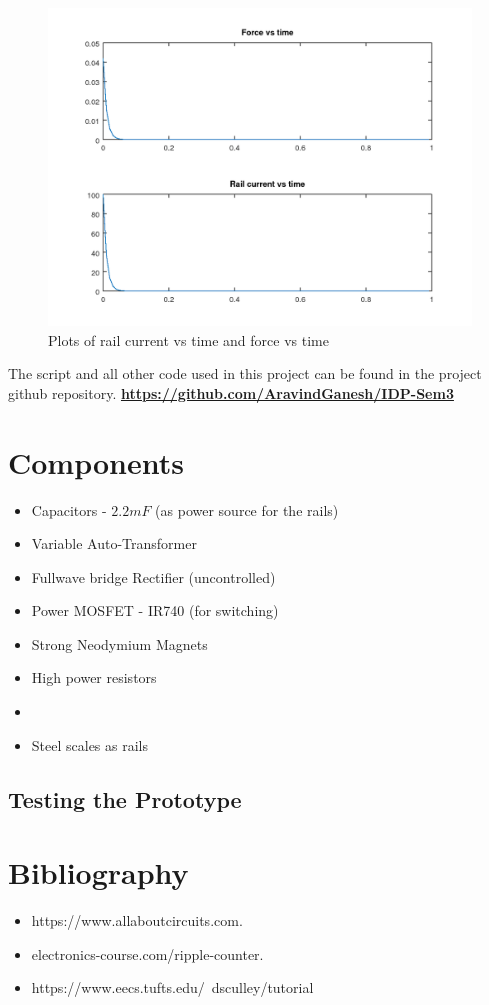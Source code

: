 \documentclass[twocolumn]{article}
\begin{document}
\begin{figure}[h]
	\caption{Plots of rail current vs time and force vs time}
	\includegraphics[width=\linewidth]{plots.png}
\end{figure}
		The script and all other code used in this project can be found in the project github repository.
\href{https://github.com/AravindGanesh/IDP-Sem3}{\textbf{https://github.com/AravindGanesh/IDP-Sem3}}



\section{Components}
\begin{itemize}
\item Capacitors - $2.2mF$  (as power source for the rails)
\item Variable Auto-Transformer 
\item Fullwave bridge Rectifier (uncontrolled)
\item Power MOSFET - IR740 (for switching)
\item Strong Neodymium Magnets
\item High power resistors
\item 
\item Steel scales as rails
\end{itemize}

\subsection*{Testing the Prototype}





\section{Bibliography} 
\begin{itemize}
\item https://www.allaboutcircuits.com.

\item electronics-course.com/ripple-counter.

\item https://www.eecs.tufts.edu/~dsculley/tutorial

\end{itemize}
\end{document}
